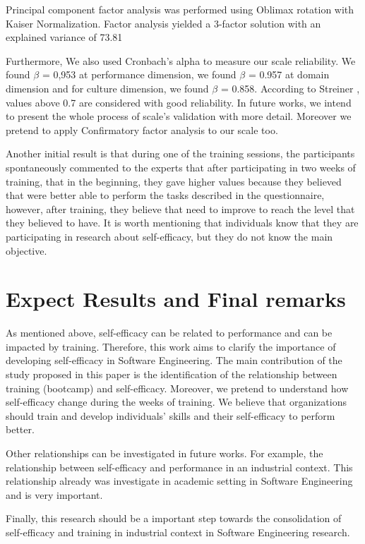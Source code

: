 \documentclass[10pt, conference]{IEEEtran}
\begin{document}
Principal component factor analysis was performed using Oblimax rotation
with Kaiser Normalization. Factor analysis yielded a 3-factor solution with an explained variance of 73.81%

Furthermore, We also used Cronbach's alpha to measure our scale reliability. We found $\beta$ = 0,953 at performance dimension, we found $\beta$ = 0.957 at domain dimension and for culture dimension, we found $\beta$ = 0.858. According to Streiner \cite{streiner2003being}, values above 0.7 are considered with good reliability.  In future works, we intend to present the whole process of scale's validation with more detail. Moreover we pretend to apply Confirmatory factor analysis to our scale too. 

Another initial result is that during one of the training sessions, the participants spontaneously commented to the experts that after participating in two weeks of training, that in the beginning, they gave higher values because they believed that were better able to perform the tasks described in the questionnaire, however, after training, they believe that need to improve to reach the level that they believed to have. It is worth mentioning that individuals know that they are participating in research about self-efficacy, but they do not know the main objective.



\section{Expect Results and Final remarks}

As mentioned above, self-efficacy can be related to performance and can be impacted by training. Therefore, this work aims to clarify the importance of developing self-efficacy in Software Engineering. 
The main contribution of the study proposed in this paper is the identification of the relationship between training (bootcamp) and self-efficacy. Moreover, we pretend to understand how self-efficacy change during the weeks of training.  We believe that organizations should train and develop individuals' skills and their self-efficacy to perform better. 

Other relationships can be investigated in future works. For example, the relationship between self-efficacy and performance in an industrial context.  This relationship already was investigate in academic setting \cite{davazdahemami2018training} in Software Engineering and is very important. 

Finally, this research should be a important step towards the consolidation of self-efficacy and training in industrial context in Software Engineering research.





\end{document}

